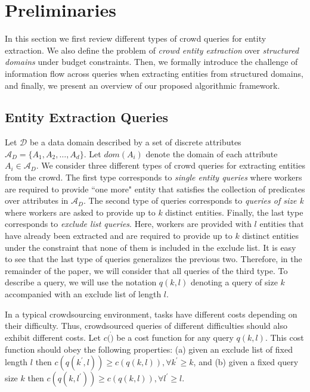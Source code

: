 \documentclass{vldb}
\newcommand{\domain}{\mathcal{D}}
\newcommand{\attributes}{\mathcal{A}_D}
\begin{document}
\section{Preliminaries}
\label{sec:prelims}
In this section we first review different types of crowd queries for entity extraction. We also define the problem of {\em crowd entity extraction} over {\em structured domains} under budget constraints. Then, we formally introduce the challenge of information flow across queries when extracting entities from structured domains, and finally, we present an overview of our proposed algorithmic framework.

\subsection{Entity Extraction Queries}
\label{sec:queries}
Let $\domain$ be a data domain described by a set of discrete attributes $\attributes = \{A_1, A_2, \dots, A_d\}$. Let $dom(A_i)$ denote the domain of each attribute $A_i  \in \attributes$.  We consider three different types of crowd queries for extracting entities from the crowd. The first type corresponds to {\em single entity queries} where workers are required to provide ``one more" entity that satisfies the collection of predicates over attributes in $\attributes$. The second type of queries corresponds to {\em queries of  size k} where workers are asked to provide up to $k$ distinct entities. Finally, the last type corresponds to {\em exclude list queries}. Here,  workers are provided with $l$ entities that have already been extracted and are required to provide up to $k$ distinct entities under the constraint that none of them is included in the exclude list. It is easy to see that the last type of queries generalizes the previous two. Therefore, in the remainder of the paper, we will consider that all queries of the third type. To describe a query, we will use the notation $q(k,l)$ denoting a query of size $k$ accompanied with an exclude list of length $l$. 

In a typical crowdsourcing environment, tasks have different costs depending on their difficulty. Thus, crowdsourced queries of different difficulties should also exhibit different costs. Let $c(\dot)$ be a cost function for any query $q(k,l)$. This cost function should obey the following properties: (a) given an exclude list of fixed length $l$ then $c(q(k^{\prime},l)) \geq c(q(k,l)),  \forall k^{\prime} \geq k$, and (b) given a fixed query size $k$ then $c(q(k,l^{\prime})) \geq c(q(k,l)), \forall l^{\prime} \geq l$. 
\end{document}
